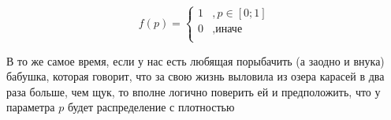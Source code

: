 \documentclass[12pt, a4paper, oneside]{extreport}
\theoremstyle{plain}              %
\theoremstyle{definition}         %
\begin{document}
\begin{figure}[H]
\begin{minipage}[H]{0.39\linewidth}
\begin{center}
\[ f(p) = \begin{cases}
             1&, p \in [0;1] \\
             0&, \text{иначе}\\
            \end{cases} \]
\end{center}
\end{minipage}
\hfill
\begin{minipage}[H]{0.59\linewidth}
\begin{center}
\end{center}
\end{minipage}
\end{figure}

В то же самое время, если у нас есть любящая порыбачить (а заодно и внука) бабушка, которая говорит, что за свою жизнь выловила из озера карасей в два раза больше, чем щук, то вполне логично поверить ей и предположить, что у параметра $p$ будет распределение с плотностью
\end{document}
